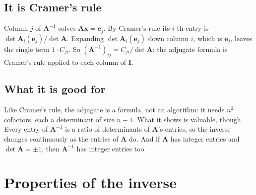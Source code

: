 \documentclass[11pt]{article}
\theoremstyle{plain}
\theoremstyle{definition}
\theoremstyle{remark}
\newcommand{\vc}[1]{\mathbf{#1}}
\newcommand{\mt}[1]{\mathbf{#1}}
\begin{document}
\subsection{It is Cramer's rule}
Column $j$ of $\mt{A}^{-1}$ solves $\mt{A}\vc{x}=\vc{e}_j$. By Cramer's rule its
$i$-th entry is $\det\mt{A}_i(\vc{e}_j)/\det\mt{A}$. Expanding
$\det\mt{A}_i(\vc{e}_j)$ down column $i$, which is $\vc{e}_j$, leaves the single
term $1\cdot C_{ji}$. So $(\mt{A}^{-1})_{ij}=C_{ji}/\det\mt{A}$: the adjugate formula
is Cramer's rule applied to each column of $\mt{I}$.

\subsection{What it is good for}
Like Cramer's rule, the adjugate is a formula, not an algorithm: it needs $n^{2}$
cofactors, each a determinant of size $n-1$. What it shows is valuable, though.
Every entry of $\mt{A}^{-1}$ is a ratio of determinants of $\mt{A}$'s entries, so
the inverse changes continuously as the entries of $\mt{A}$ do. And if $\mt{A}$ has
integer entries and $\det\mt{A}=\pm1$, then $\mt{A}^{-1}$ has integer entries too.

\section{Properties of the inverse}

\end{document}
